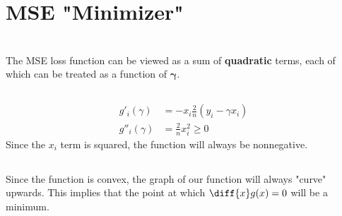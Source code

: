 \documentclass{article}
\begin{document}
\section*{MSE "Minimizer"}

\section{}

\subsection{}

The MSE loss function can be viewed as a sum of \textbf{quadratic} terms, each of which can be treated as a function of \(\bm{\gamma}\).

\subsection{}

\begin{align}
    g'_i(\gamma) &= -x_i \frac{2}{n} (y_i - \gamma x_i) \\
    g''_i(\gamma) &= \frac{2}{n} x_i^2 \geqslant 0
\end{align}
Since the \(x_i\) term is squared, the function will always be nonnegative.

\subsection{}

Since the function is convex, the graph of our function will always "curve" upwards.
This implies that the point at which \(\diff{x} g(x) = 0\) will be a minimum.

\subsection{}

\subsubsection{}
\end{document}
